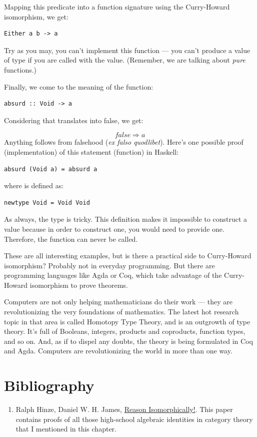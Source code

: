 Mapping this predicate into a function signature using the Curry-Howard
isomorphism, we get:

\begin{Verbatim}
Either a b -> a
\end{Verbatim}
Try as you may, you can't implement this function --- you can't produce
a value of type  if you are called with the 
value. (Remember, we are talking about \emph{pure} functions.)

Finally, we come to the meaning of the  function:

\begin{Verbatim}
absurd :: Void -> a
\end{Verbatim}
Considering that  translates into false, we get:

\[false \Rightarrow a\]
Anything follows from falsehood (\emph{ex falso quodlibet}). Here's one
possible proof (implementation) of this statement (function) in Haskell:

\begin{Verbatim}
absurd (Void a) = absurd a
\end{Verbatim}
where  is defined as:

\begin{Verbatim}
newtype Void = Void Void
\end{Verbatim}
As always, the type  is tricky. This definition makes it
impossible to construct a value because in order to construct one, you
would need to provide one. Therefore, the function  can
never be called.

These are all interesting examples, but is there a practical side to
Curry-Howard isomorphism? Probably not in everyday programming. But
there are programming languages like Agda or Coq, which take advantage
of the Curry-Howard isomorphism to prove theorems.

Computers are not only helping mathematicians do their work --- they are
revolutionizing the very foundations of mathematics. The latest hot
research topic in that area is called Homotopy Type Theory, and is an
outgrowth of type theory. It's full of Booleans, integers, products and
coproducts, function types, and so on. And, as if to dispel any doubts,
the theory is being formulated in Coq and Agda. Computers are
revolutionizing the world in more than one way.

\section{Bibliography}\label{bibliography}

\begin{enumerate}
\tightlist
\item
  Ralph Hinze, Daniel W. H. James,
  \href{http://www.cs.ox.ac.uk/ralf.hinze/publications/WGP10.pdf}{Reason
  Isomorphically!}. This paper contains proofs of all those high-school
  algebraic identities in category theory that I mentioned in this
  chapter.
\end{enumerate}